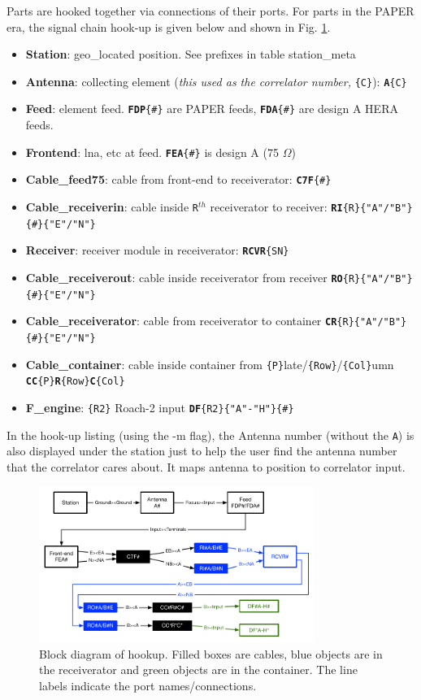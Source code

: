 \documentclass{article}
\begin{document}
Parts are hooked together via connections of their ports.   For parts in the PAPER era, the signal chain hook-up is given below and shown in Fig. \ref{fig:hookup}.
\begin{itemize}
\setlength\itemsep{-.3em}
	\item {\bf Station}: geo\_located position.  See prefixes in table station\_meta
	\item {\bf Antenna}:  collecting element ({\em this used as the correlator number,} {\tt \{C\}}):  {\tt{\bf A}\{C\}}
	\item {\bf Feed}:  element feed.  {\tt {\bf FDP}\{\#\}} are PAPER feeds, {\tt {\bf FDA}\{\#\}} are design A HERA feeds.
	\item {\bf Frontend}:  lna, etc at feed.  {\tt {\bf FEA}\{\#\}} is design A (75 $\Omega$)
	\item {\bf Cable\_feed75}:  cable from front-end to receiverator: {\tt {\bf C7F}\{\#\}}
	\item {\bf Cable\_receiverin}:  cable inside {\tt R}$^{th}$ receiverator to receiver: {\tt {\bf RI}\{R\}\{"A"/"B"\}\{\#\}\{"E"/"N"\}}
	\item {\bf Receiver}:  receiver module in receiverator: {\tt {\bf RCVR}\{SN\}}
	\item {\bf Cable\_receiverout}:  cable inside receiverator from receiver {\tt {\bf RO}\{R\}\{"A"/"B"\}\{\#\}\{"E"/"N"\}}
	\item {\bf Cable\_receiverator}:  cable from receiverator to container {\tt {\bf CR}\{R\}\{"A"/"B"\}\{\#\}\{"E"/"N"\}}
	\item {\bf Cable\_container}:  cable inside container from {\tt\{P\}}late/{\tt\{Row\}}/{\tt\{Col\}}umn {\tt {\bf CC}\{P\}{\bf R}\{Row\}{\bf C}\{Col\}}
	\item {\bf F\_engine}:  {\tt\{R2\}} Roach-2 input {\tt {\bf DF}\{R2\}\{"A"-"H"\}\{\#\}}
\end{itemize}

In the hook-up listing (using the -m flag), the Antenna number (without the {\tt A}) is also displayed under the station just to help the user find the antenna number that the correlator cares about.  It maps antenna to position to correlator input.

\begin{figure}[H]
\includegraphics[width=0.8\textwidth]{hookup.pdf}
\centering
\caption{Block diagram of hookup.  Filled boxes are cables, blue objects are in the receiverator and green objects are in the container.
The line labels indicate the port names/connections.}
\label{fig:hookup}
\end{figure}
\end{document}
